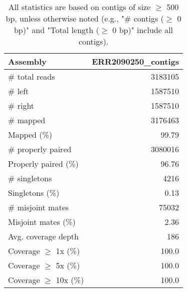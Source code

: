 \documentclass[12pt,a4paper]{article}
\begin{document}
\begin{table}[ht]
\begin{center}
\caption{All statistics are based on contigs of size $\geq$ 500 bp, unless otherwise noted (e.g., "\# contigs ($\geq$ 0 bp)" and "Total length ($\geq$ 0 bp)" include all contigs).}
\begin{tabular}{|l*{1}{|r}|}
\hline
Assembly & ERR2090250\_contigs \\ \hline
\# total reads & 3183105 \\ \hline
\# left & 1587510 \\ \hline
\# right & 1587510 \\ \hline
\# mapped & 3176463 \\ \hline
Mapped (\%) & 99.79 \\ \hline
\# properly paired & 3080016 \\ \hline
Properly paired (\%) & 96.76 \\ \hline
\# singletons & 4216 \\ \hline
Singletons (\%) & 0.13 \\ \hline
\# misjoint mates & 75032 \\ \hline
Misjoint mates (\%) & 2.36 \\ \hline
Avg. coverage depth & 186 \\ \hline
Coverage $\geq$ 1x (\%) & 100.0 \\ \hline
Coverage $\geq$ 5x (\%) & 100.0 \\ \hline
Coverage $\geq$ 10x (\%) & 100.0 \\ \hline
\end{tabular}
\end{center}
\end{table}
\end{document}
